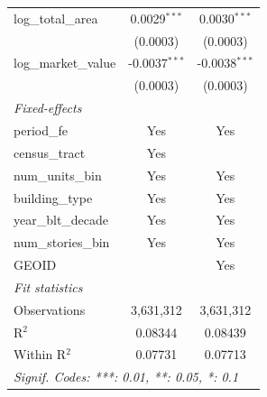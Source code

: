 \begin{tabular}{lcc}
   log\_total\_area                & 0.0029$^{***}$          & 0.0030$^{***}$\\   
                                   & (0.0003)                & (0.0003)\\   
   log\_market\_value              & -0.0037$^{***}$         & -0.0038$^{***}$\\   
                                   & (0.0003)                & (0.0003)\\   
   \midrule
   \emph{Fixed-effects}\\
   period\_fe                      & Yes                     & Yes\\  
   census\_tract                   & Yes                     & \\  
   num\_units\_bin                 & Yes                     & Yes\\  
   building\_type                  & Yes                     & Yes\\  
   year\_blt\_decade               & Yes                     & Yes\\  
   num\_stories\_bin               & Yes                     & Yes\\  
   GEOID                           &                         & Yes\\  
   \midrule
   \emph{Fit statistics}\\
   Observations                    & 3,631,312               & 3,631,312\\  
   R$^2$                           & 0.08344                 & 0.08439\\  
   Within R$^2$                    & 0.07731                 & 0.07713\\  
   \midrule \midrule
   \multicolumn{3}{l}{\emph{Signif. Codes: ***: 0.01, **: 0.05, *: 0.1}}\\
\end{tabular}
\par\endgroup
